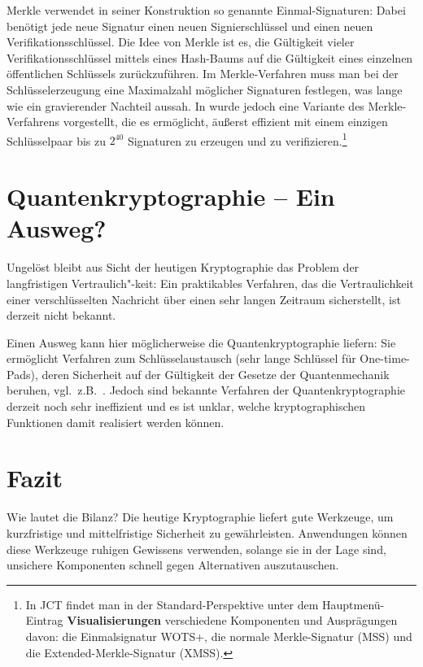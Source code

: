 \begin{refsegment}
Merkle verwendet in seiner Konstruktion so genannte Einmal-Signaturen:
Dabei benötigt jede neue Signatur einen neuen Signierschlüssel und einen
neuen Verifikationsschlüssel. Die Idee von Merkle ist es, die Gültigkeit
vieler Verifikationsschlüssel mittels eines Hash-Baums auf die
Gültigkeit eines einzelnen öffentlichen Schlüssels zurückzuführen. Im
Merkle-Verfahren muss man bei der Schlüsselerzeugung eine Maximalzahl
möglicher Signaturen festlegen, was lange wie ein gravierender Nachteil
aussah. In \cite{buchmann/coronado/dahmen/doering/klintsevich:2006}
wurde jedoch eine Variante des Merkle-Verfahrens vorgestellt, die es
ermöglicht, äußerst effizient mit einem einzigen Schlüsselpaar bis zu
$2^{40}$ Signaturen zu erzeugen und zu verifizieren.\footnote{%
  In JCT findet man in der Standard-Perspektive
  unter dem Hauptmenü-Eintrag \textbf{Visualisierungen} verschiedene
  Komponenten und Ausprägungen davon: die Einmalsignatur WOTS+,
  die normale Merkle-Signatur (MSS) und die Extended-Merkle-Signatur
  (XMSS).
}


\section{Quantenkryptographie -- Ein Ausweg?}%
\label{sec:Quantenkryptographie}

Ungelöst bleibt aus Sicht der heutigen Kryptographie das Problem der
langfristigen Vertraulich"-keit: Ein praktikables Verfahren, das die
Vertraulichkeit einer verschlüsselten Nachricht über einen sehr langen
Zeitraum sicherstellt, ist derzeit nicht bekannt.

Einen Ausweg kann hier möglicherweise die Quantenkryptographie liefern:
Sie ermöglicht Verfahren zum Schlüsselaustausch (sehr lange Schlüssel
für One-time-Pads), deren Sicherheit auf der Gültigkeit
der Gesetze der Quantenmechanik beruhen, vgl.\ z.B.\
\cite{bennett/brassard:1984b}. Jedoch sind bekannte Verfahren der
Quantenkryptographie derzeit noch sehr ineffizient und es ist unklar,
welche kryptographischen Funktionen damit realisiert werden können.


\section{Fazit}
\label{sec:fazit}

Wie lautet die Bilanz? Die heutige Kryptographie
liefert gute Werkzeuge, um kurzfristige und mittelfristige
Sicherheit zu gewährleisten. Anwendungen können diese
Werkzeuge ruhigen Gewissens verwenden, solange sie in
der Lage sind, unsichere Komponenten schnell gegen
Alternativen auszutauschen.


\end{refsegment}
